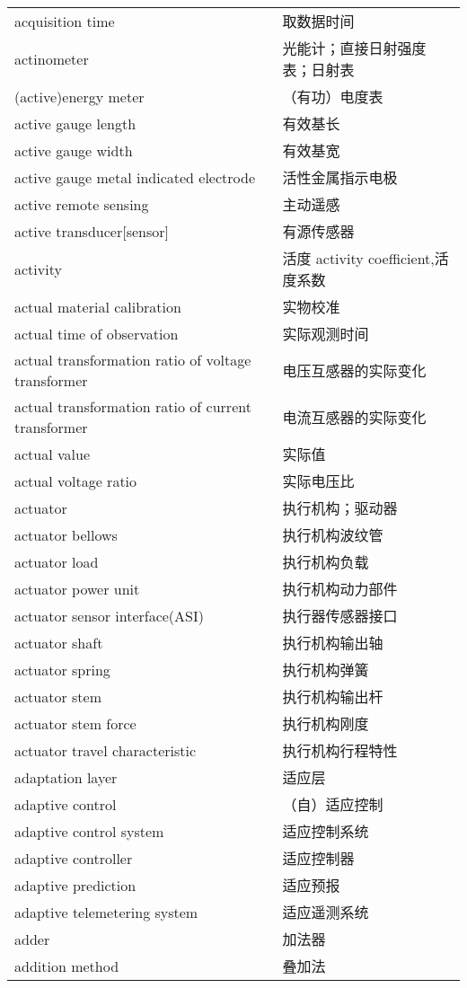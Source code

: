 \documentclass[
]{article}
\begin{document}
\begin{longtable}[]{@{}ll@{}}
acquisition time & 取数据时间 \\
actinometer & 光能计；直接日射强度表；日射表 \\
(active)energy meter & （有功）电度表 \\
active gauge length & 有效基长 \\
active gauge width & 有效基宽 \\
active gauge metal indicated electrode & 活性金属指示电极 \\
active remote sensing & 主动遥感 \\
active transducer{[}sensor{]} & 有源传感器 \\
activity & 活度 activity coefficient,活度系数 \\
actual material calibration & 实物校准 \\
actual time of observation & 实际观测时间 \\
actual transformation ratio of voltage transformer &
电压互感器的实际变化 \\
actual transformation ratio of current transformer &
电流互感器的实际变化 \\
actual value & 实际值 \\
actual voltage ratio & 实际电压比 \\
actuator & 执行机构；驱动器 \\
actuator bellows & 执行机构波纹管 \\
actuator load & 执行机构负载 \\
actuator power unit & 执行机构动力部件 \\
actuator sensor interface(ASI) & 执行器传感器接口 \\
actuator shaft & 执行机构输出轴 \\
actuator spring & 执行机构弹簧 \\
actuator stem & 执行机构输出杆 \\
actuator stem force & 执行机构刚度 \\
actuator travel characteristic & 执行机构行程特性 \\
adaptation layer & 适应层 \\
adaptive control & （自）适应控制 \\
adaptive control system & 适应控制系统 \\
adaptive controller & 适应控制器 \\
adaptive prediction & 适应预报 \\
adaptive telemetering system & 适应遥测系统 \\
adder & 加法器 \\
addition method & 叠加法 \\

\end{longtable}
\end{document}
